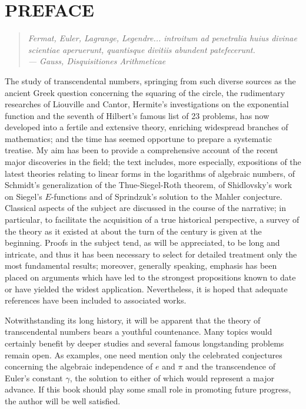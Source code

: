 
\chapter*{PREFACE}

\begin{quote}
\centering\itshape
Fermat, Euler, Lagrange, Legendre... introitum ad penetralia huius divinae scientiae aperuerunt, quantisque divitiis abundent patefecerunt. \\
\hfill --- Gauss, \textit{Disquisitiones Arithmeticae}
\end{quote}

\vspace{1em}

The study of transcendental numbers, springing from such diverse sources as the ancient Greek question concerning the squaring of the circle, the rudimentary researches of Liouville and Cantor, Hermite's investigations on the exponential function and the seventh of Hilbert's famous list of 23 problems, has now developed into a fertile and extensive theory, enriching widespread branches of mathematics; and the time has seemed opportune to prepare a systematic treatise. My aim has been to provide a comprehensive account of the recent major discoveries in the field; the text includes, more especially, expositions of the latest theories relating to linear forms in the logarithms of algebraic numbers, of Schmidt's generalization of the Thue-Siegel-Roth theorem, of Shidlovsky's work on Siegel's $E$-functions and of Sprindzuk's solution to the Mahler conjecture. Classical aspects of the subject are discussed in the course of the narrative; in particular, to facilitate the acquisition of a true historical perspective, a survey of the theory as it existed at about the turn of the century is given at the beginning. Proofs in the subject tend, as will be appreciated, to be long and intricate, and thus it has been necessary to select for detailed treatment only the most fundamental results; moreover, generally speaking, emphasis has been placed on arguments which have led to the strongest propositions known to date or have yielded the widest application. Nevertheless, it is hoped that adequate references have been included to associated works.

Notwithstanding its long history, it will be apparent that the theory of transcendental numbers bears a youthful countenance. Many topics would certainly benefit by deeper studies and several famous longstanding problems remain open. As examples, one need mention only the celebrated conjectures concerning the algebraic independence of $e$ and $\pi$ and the transcendence of Euler's constant $\gamma$, the solution to either of which would represent a major advance. If this book should play some small role in promoting future progress, the author will be well satisfied.

